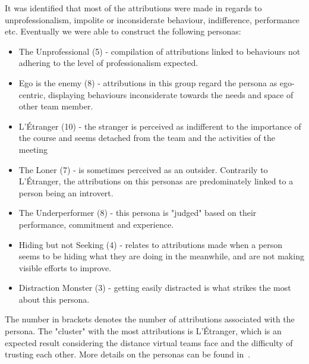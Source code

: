 It was identified that most of the attributions were made in regards to unprofessionalism, impolite or inconsiderate behaviour,  indifference,  performance etc.  Eventually we were able to construct the following personas: 

\begin{itemize}
	\item The Unprofessional (5) - compilation of attributions linked to behaviours not adhering to the level of professionalism expected.
	\item Ego is the enemy (8) - attributions in this group regard the persona as ego-centric, displaying behaviours inconsiderate towards the needs and space of other team member.
	\item L'Étranger (10) - the stranger is perceived as indifferent to the importance of the course and seems detached from the team and the activities of the meeting
	\item The Loner (7) - is sometimes perceived as an outsider. Contrarily to L'Étranger, the attributions on this personas are predominately linked to a person being an introvert.
	\item The Underperformer (8) - this persona is "judged" based on their performance, commitment and experience.
	\item Hiding but not Seeking (4) - relates to attributions made when a person seems to be hiding what they are doing in the meanwhile,  and are not making visible efforts to improve.
	\item Distraction Monster (3) - getting easily distracted is what strikes the most about this persona.
\end{itemize}

The number in brackets denotes the number of attributions associated with the persona. The "cluster" with the most attributions is L'Étranger, which is an expected result considering the distance virtual teams face and the difficulty of trusting each other. More details on the personas can be found in~.




